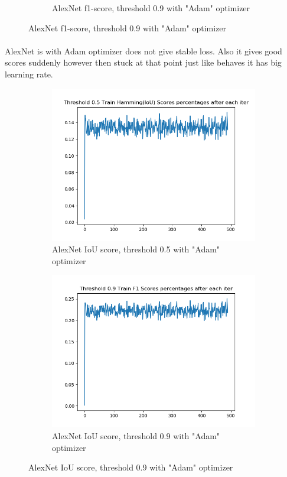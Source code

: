 \begin{figure}[!ht]
\begin{subfigure}{.5\textwidth}
	\caption{\label{alexnet:alexnet-lazy-adam-1_0-train-scores-f1-9}AlexNet f1-score, threshold 0.9 with "Adam" optimizer}
\end{subfigure}
\end{figure}
\paragraph{}AlexNet is with Adam optimizer does not give stable loss. Also it gives good scores suddenly however then stuck at that point just like behaves it has big learning rate.
\begin{figure}[!ht]
\centering
\begin{subfigure}{.5\textwidth}
	\centering
	\includegraphics[width=1\linewidth]{alexnet-lazy-adam-1_0-train-scores-hs-5.png}
	\caption{\label{alexnet:alexnet-lazy-adam-1_0-train-scores-hs-5}AlexNet IoU score, threshold 0.5 with "Adam" optimizer}
\end{subfigure}%
\begin{subfigure}{.5\textwidth}
	\centering
	\includegraphics[width=1\linewidth]{alexnet-lazy-adam-1_0-train-scores-f1-9.png}
	\caption{\label{alexnet:alexnet-lazy-adam-1_0-train-scores-hs-9}AlexNet IoU score, threshold 0.9 with "Adam" optimizer} 
\end{subfigure}
\end{figure}

